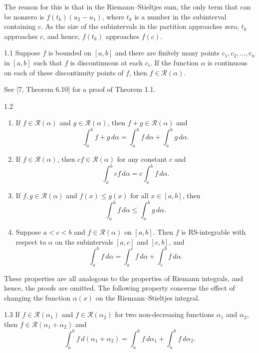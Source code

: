 The reason for this is that in the Riemann--Stieltjes sum, the only term that can be nonzero is $f(t_k)(u_2-u_1)$, where $t_k$ is a number in the subinterval containing $c$. As the size of the subintervals in the partition approaches zero, $t_k$ approaches $c$, and hence, $f(t_k)$ approaches $f(c)$.

\begin{thmbox}{1.1}
Suppose $f$ is bounded on $[a,b]$ and there are finitely many points $c_1,c_2,\dots,c_n$ in $[a,b]$ such that $f$ is discontinuous at each $c_i$. If the function $\alpha$ is continuous on each of these discontinuity points of $f$, then $f\in \mathcal{R}(\alpha)$.
\end{thmbox}

See [7, Theorem 6.10] for a proof of Theorem 1.1.

\begin{thmbox}{1.2}
\begin{enumerate}[label=\arabic*.]
    \item If $f\in \mathcal{R}(\alpha)$ and $g\in \mathcal{R}(\alpha)$, then $f+g\in \mathcal{R}(\alpha)$ and
    \[
    \int_a^b f+g\, d\alpha = \int_a^b f\, d\alpha + \int_a^b g\, d\alpha.
    \]
    \item If $f\in \mathcal{R}(\alpha)$, then $cf\in \mathcal{R}(\alpha)$ for any constant $c$ and
    \[
    \int_a^b cf\, d\alpha = c\int_a^b f\, d\alpha.
    \]
    \item If $f,g\in \mathcal{R}(\alpha)$ and $f(x)\le g(x)$ for all $x\in [a,b]$, then
    \[
    \int_a^b f\, d\alpha \le \int_a^b g\, d\alpha.
    \]
    \item Suppose $a<c<b$ and $f\in\mathcal{R}(\alpha)$ on $[a,b]$. Then $f$ is RS-integrable with respect to $\alpha$ on the subintervals $[a,c]$ and $[c,b]$, and
    \[
    \int_a^b f\, d\alpha = \int_a^c f\, d\alpha + \int_c^b f\, d\alpha.
    \]
\end{enumerate}
\end{thmbox}
These properties are all analogous to the properties of Riemann integrals, and hence, the proofs are omitted. The following property concerns the effect of changing the function $\alpha(x)$ on the Riemann--Stieltjes integral.

\begin{thmbox}{1.3}
If $f \in \mathcal{R}(\alpha_1)$ and $f \in \mathcal{R}(\alpha_2)$ for two non-decreasing functions $\alpha_1$ and $\alpha_2$, then $f \in \mathcal{R}(\alpha_1+\alpha_2)$ and
\[
\int_a^b f\, d(\alpha_1+\alpha_2)=\int_a^b f\, d\alpha_1+\int_a^b f\, d\alpha_2.
\]
\end{thmbox}


